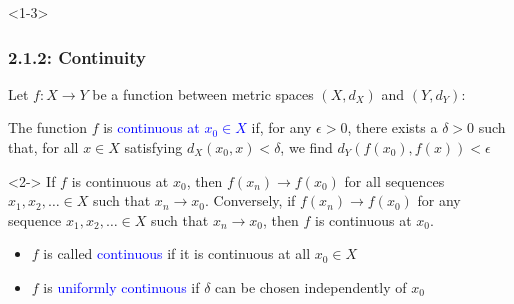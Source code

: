 \documentclass[10pt,english,aspectratio=169]{beamer}
\begin{document}
\begin{frame}<1-3>
\frametitle{2.1.2: Continuity}

Let $f \colon X \rightarrow Y$ be a function between metric spaces $(X,d_X)$ and $(Y,d_Y)$:

\begin{definition}
The function $f$ is \textcolor{blue}{continuous at $x_0 \in X$} if, for any $\epsilon> 0$, there exists a $\delta >0$ such that, for all $x\in X$ satisfying $d_X(x_0,x)< \delta$, we find $d_Y \left( f(x_0),f(x) \right) < \epsilon$
\end{definition}

\begin{theorem}<2-> 
If $f$ is continuous at $x_0$, then $f(x_n) \to f(x_0)$ for all sequences $x_1,x_2,\ldots \in X$ such that $x_n \to x_0$.
Conversely, if $f(x_n) \to f(x_0)$ for any sequence $x_1,x_2,\ldots  \in X$ such that $x_n \to x_0$, then $f$ is continuous at $x_0$.
\end{theorem}

\begin{itemize}
\setlength\itemsep{1.5mm}
\item<3-> $f$ is called \textcolor{blue}{continuous} if it is continuous at all $x_0 \in X$
\item<3-> $f$ is \textcolor{blue}{uniformly continuous} if $\delta$ can be chosen independently of $x_0$
\end{itemize}



\end{frame}
\end{document}
